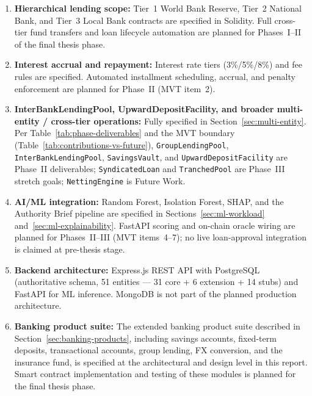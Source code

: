 \documentclass[12pt,a4paper]{report}
\begin{document}
\begin{enumerate}[noitemsep]
\item \textbf{Hierarchical lending scope:} Tier~1 World Bank Reserve, Tier~2 National Bank, and Tier~3 Local Bank contracts are specified in Solidity. Full cross-tier fund transfers and loan lifecycle automation are planned for Phases~I--II of the final thesis phase.

\item \textbf{Interest accrual and repayment:} Interest rate tiers (3\%/5\%/8\%) and fee rules are specified. Automated installment scheduling, accrual, and penalty enforcement are planned for Phase~II (MVT item~2).

\item \textbf{InterBankLendingPool, UpwardDepositFacility, and broader multi-entity / cross-tier operations:} Fully specified in Section~\ref{sec:multi-entity}. Per Table~\ref{tab:phase-deliverables} and the MVT boundary (Table~\ref{tab:contributions-vs-future}), \texttt{GroupLendingPool}, \texttt{InterBankLendingPool}, \texttt{SavingsVault}, and \texttt{UpwardDepositFacility} are Phase~II deliverables; \texttt{SyndicatedLoan} and \texttt{TranchedPool} are Phase~III stretch goals; \texttt{NettingEngine} is Future Work.

\item \textbf{AI/ML integration:} Random Forest, Isolation Forest, SHAP, and the Authority Brief pipeline are specified in Sections~\ref{sec:ml-workload} and~\ref{sec:ml-explainability}. FastAPI scoring and on-chain oracle wiring are planned for Phases~II--III (MVT items~4--7); no live loan-approval integration is claimed at pre-thesis stage.

\item \textbf{Backend architecture:} Express.js REST API with PostgreSQL (authoritative schema, 51 entities --- 31 core + 6 extension + 14 stubs) and FastAPI for ML inference. MongoDB is not part of the planned production architecture.

\item \textbf{Banking product suite:} The extended banking product suite described in Section~\ref{sec:banking-products}, including savings accounts, fixed-term deposits, transactional accounts, group lending, FX conversion, and the insurance fund, is specified at the architectural and design level in this report. Smart contract implementation and testing of these modules is planned for the final thesis phase.
\end{enumerate}
\end{document}
